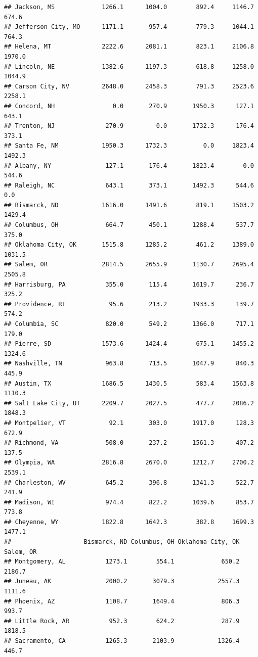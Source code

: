 \documentclass[
]{article}
\begin{document}
\begin{verbatim}
## Jackson, MS             1266.1      1004.0        892.4     1146.7       674.6
## Jefferson City, MO      1171.1       957.4        779.3     1044.1       764.3
## Helena, MT              2222.6      2081.1        823.1     2106.8      1970.0
## Lincoln, NE             1382.6      1197.3        618.8     1258.0      1044.9
## Carson City, NV         2648.0      2458.3        791.3     2523.6      2258.1
## Concord, NH                0.0       270.9       1950.3      127.1       643.1
## Trenton, NJ              270.9         0.0       1732.3      176.4       373.1
## Santa Fe, NM            1950.3      1732.3          0.0     1823.4      1492.3
## Albany, NY               127.1       176.4       1823.4        0.0       544.6
## Raleigh, NC              643.1       373.1       1492.3      544.6         0.0
## Bismarck, ND            1616.0      1491.6        819.1     1503.2      1429.4
## Columbus, OH             664.7       450.1       1288.4      537.7       375.0
## Oklahoma City, OK       1515.8      1285.2        461.2     1389.0      1031.5
## Salem, OR               2814.5      2655.9       1130.7     2695.4      2505.8
## Harrisburg, PA           355.0       115.4       1619.7      236.7       325.2
## Providence, RI            95.6       213.2       1933.3      139.7       574.2
## Columbia, SC             820.0       549.2       1366.0      717.1       179.0
## Pierre, SD              1573.6      1424.4        675.1     1455.2      1324.6
## Nashville, TN            963.8       713.5       1047.9      840.3       445.9
## Austin, TX              1686.5      1430.5        583.4     1563.8      1110.3
## Salt Lake City, UT      2209.7      2027.5        477.7     2086.2      1848.3
## Montpelier, VT            92.1       303.0       1917.0      128.3       672.9
## Richmond, VA             508.0       237.2       1561.3      407.2       137.5
## Olympia, WA             2816.8      2670.0       1212.7     2700.2      2539.1
## Charleston, WV           645.2       396.8       1341.3      522.7       241.9
## Madison, WI              974.4       822.2       1039.6      853.7       773.8
## Cheyenne, WY            1822.8      1642.3        382.8     1699.3      1477.1
##                    Bismarck, ND Columbus, OH Oklahoma City, OK Salem, OR
## Montgomery, AL           1273.1        554.1             650.2    2186.7
## Juneau, AK               2000.2       3079.3            2557.3    1111.6
## Phoenix, AZ              1108.7       1649.4             806.3     993.7
## Little Rock, AR           952.3        624.2             287.9    1818.5
## Sacramento, CA           1265.3       2103.9            1326.4     446.7

\end{verbatim}
\end{document}
